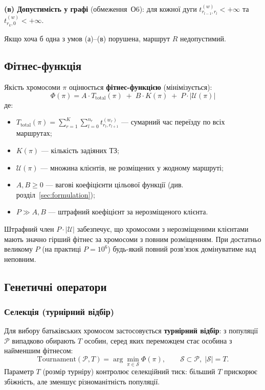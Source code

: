 \documentclass[14pt,a4paper]{extarticle}
\theoremstyle{definition}
\theoremstyle{plain}
\begin{document}
\textbf{(в) Допустимість у графі} (обмеження~О6): для кожної дуги $t_{r_{l-1}, r_l}^{(w)} < +\infty$ та $t_{r_k, 0}^{(w)} < +\infty$.

Якщо хоча б одна з умов (а)--(в) порушена, маршрут $R$ недопустимий.

\subsection{Фітнес-функція}

Якість хромосоми $\pi$ оцінюється \textbf{фітнес-функцією} (мінімізується):
\[
    \boxed{\;
    \Phi(\pi) = A \cdot T_{\mathrm{total}}(\pi) \;+\; B \cdot K(\pi) \;+\; P \cdot |\mathcal{U}(\pi)|
    \;}
\]
де:
\begin{itemize}[leftmargin=2em]
    \item $T_{\mathrm{total}}(\pi) = \sum_{r=1}^{K} \sum_{l=0}^{n_r} t_{r_l, r_{l+1}}^{(w_r)}$ --- сумарний час переїзду по всіх маршрутах;
    \item $K(\pi)$ --- кількість задіяних ТЗ;
    \item $\mathcal{U}(\pi)$ --- множина клієнтів, не розміщених у жодному маршруті;
    \item $A, B \geq 0$ --- вагові коефіцієнти цільової функції (див. розділ~\ref{sec:formulation});
    \item $P \gg A, B$ --- штрафний коефіцієнт за нерозміщеного клієнта.
\end{itemize}

Штрафний член $P \cdot |\mathcal{U}|$ забезпечує, що хромосоми з нерозміщеними клієнтами мають значно гірший фітнес за хромосоми з повним розміщенням. При достатньо великому $P$ (на практиці $P = 10^6$) будь-який повний розв'язок домінуватиме над неповним.

\subsection{Генетичні оператори}

\subsubsection{Селекція (турнірний відбір)}

Для вибору батьківських хромосом застосовується \textbf{турнірний відбір}: з популяції $\mathcal{P}$ випадково обирають $T$ особин, серед яких переможцем стає особина з найменшим фітнесом:
\[
    \mathrm{Tournament}(\mathcal{P}, T) = \arg\min_{\pi \in \mathcal{S}} \Phi(\pi),
    \qquad
    \mathcal{S} \subset \mathcal{P},\; |\mathcal{S}| = T.
\]
Параметр $T$ (розмір турніру) контролює селекційний тиск: більший $T$ прискорює збіжність, але зменшує різноманітність популяції.
\end{document}
